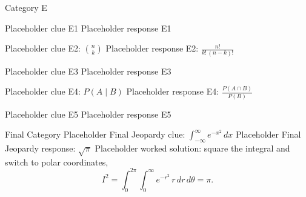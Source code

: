 \documentclass{article}
\begin{document}
\begin{category}{Category E}
  \begin{clue}
    Placeholder clue E1
  \response
    Placeholder response E1
  \end{clue}
  \begin{clue}
    Placeholder clue E2: $\binom{n}{k}$
  \response
    Placeholder response E2: $\frac{n!}{k!\,(n-k)!}$
  \end{clue}
  \begin{clue}
    Placeholder clue E3
  \response
    Placeholder response E3
  \end{clue}
  \begin{clue}
    Placeholder clue E4: $P(A \mid B)$
  \response
    Placeholder response E4: $\frac{P(A \cap B)}{P(B)}$
  \end{clue}
  \begin{clue}
    Placeholder clue E5
  \response
    Placeholder response E5
  \end{clue}
\end{category}

\begin{final}{Final Category}
  Placeholder Final Jeopardy clue: $\displaystyle\int_{-\infty}^{\infty} e^{-x^2}\,dx$
\response
  Placeholder Final Jeopardy response: $\sqrt{\pi}$
\solution
  Placeholder worked solution: square the integral and switch to polar coordinates,
  \[ I^2 = \int_0^{2\pi}\!\!\int_0^\infty e^{-r^2}\, r\,dr\,d\theta = \pi. \]
\end{final}
\end{document}
